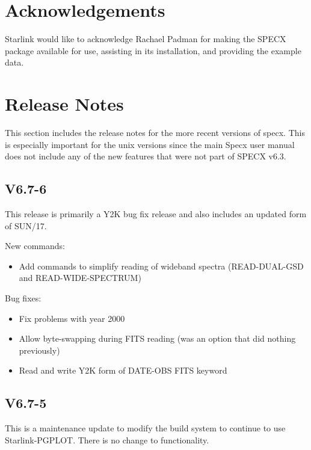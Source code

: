 \documentclass[twoside,11pt]{article}
\renewcommand{\_}{\texttt{\symbol{95}}}
\begin{document}
\section{Acknowledgements}

Starlink would like to acknowledge Rachael Padman for making
the SPECX package available for use, assisting in its installation,
and providing the example data.

\appendix

\section{Release Notes}

This section includes the release notes for the more recent versions
of specx. This is especially important for the unix versions since
the main Specx user manual does not include any of the new features
that were not part of SPECX v6.3.

\subsection{V6.7-6}

This release is primarily a Y2K bug fix release and also includes an
updated form of SUN/17.

\begin{description}

\item New commands:
\begin{itemize}
\item Add commands to simplify reading of wideband spectra (READ-DUAL-GSD and
READ-WIDE-SPECTRUM)
\end{itemize}
\item Bug fixes:
\begin{itemize}
\item Fix problems with year 2000
\item Allow byte-swapping during FITS reading (was an option that
    did nothing previously)
\item Read and write Y2K form of DATE-OBS FITS keyword
\end{itemize}
\end{description}

\subsection{V6.7-5}

This is a maintenance update to modify the build system to continue to use
Starlink-PGPLOT.  There is no change to functionality.
\end{document}
